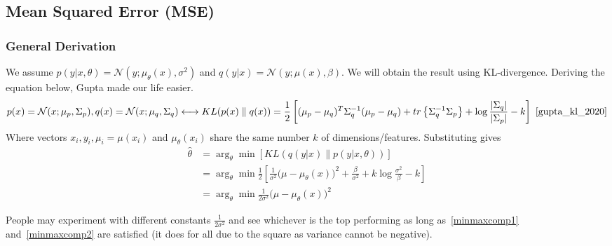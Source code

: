 \documentclass{article}
\numberwithin{equation}{subsection}
\begin{document}
\subsection{Mean Squared Error (MSE)}
\subsubsection{General Derivation}
\label{mse_derivation}
We assume $p(y|x,\theta) = \mathcal{N}(y; \mu_\theta(x),\sigma^2)$ and $q(y|x) = \mathcal{N}(y; \mu(x),\beta)$. We will obtain the result using KL-divergence. Deriving the equation below, Gupta made our life easier.
\begin{equation}
    p(x) = \mathcal{N}(x;\mu_p,\Sigma_p), q(x) = \mathcal{N}(x;\mu_q,\Sigma_q) \longleftrightarrow KL(p(x) \parallel q(x)) = \frac{1}{2}\left[(\mu_p-\mu_q)^T\Sigma_q^{-1}(\mu_p-\mu_q) + tr\left\{\Sigma_q^{-1}\Sigma_p\right\}+\log\frac{|\Sigma_q|}{|\Sigma_p|} - k\right]~\cite{gupta_kl_2020}\label{gupta_kl}
\end{equation}
Where vectors $x_i, y_i, \mu_i=\mu(x_i)$ and $\mu_\theta(x_i)$ share the same number $k$ of dimensions/features. Substituting gives
\begin{align}
    \hat{\theta} 
    &= \arg_\theta \min[KL(q(y|x) \parallel p(y|x,\theta))]\\
    &= \arg_\theta \min\frac{1}{2}\left[\frac{1}{\sigma^2}\big(\mu-\mu_\theta(x)\big)^2 + \frac{\beta}{\sigma^2}+k\log\frac{\sigma^2}{\beta} - k\right]\\
    &= \arg_\theta \min\frac{1}{2\sigma^2}\big(\mu-\mu_\theta(x)\big)^2\label{mse_derivation_res2}
\end{align}

People may experiment with different constants $\frac{1}{2\sigma^2}$ and see whichever is the top performing as long as~\ref{minmaxcomp1} and~\ref{minmaxcomp2} are satisfied (it does for all due to the square as variance cannot be negative).
\end{document}
